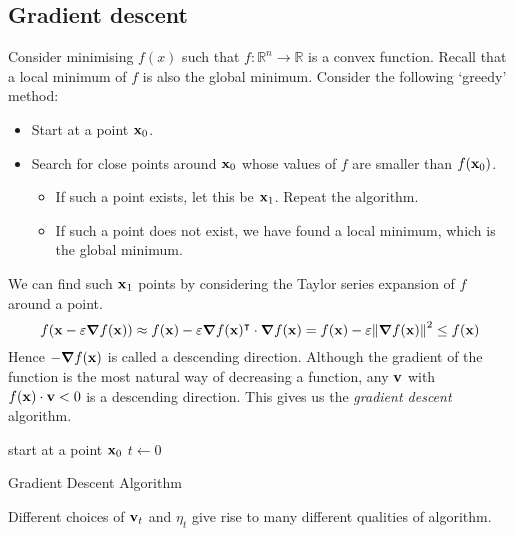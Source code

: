 \subsection{Gradient descent}
Consider minimising \(f(x)\) such that \(f \colon \mathbb R^n \to \mathbb R\) is a convex function.
Recall that a local minimum of \(f\) is also the global minimum.
Consider the following `greedy' method:
\begin{itemize}
	\item Start at a point \(\vb x_0\).
	\item Search for close points around \(\vb x_0\) whose values of \(f\) are smaller than \(f(\vb x_0)\).
	      \begin{itemize}
		      \item If such a point exists, let this be \(\vb x_1\).
		            Repeat the algorithm.
		      \item If such a point does not exist, we have found a local minimum, which is the global minimum.
	      \end{itemize}
\end{itemize}
We can find such \(\vb x_1\) points by considering the Taylor series expansion of \(f\) around a point.
\[
	f(\vb x - \varepsilon\grad{f(\vb x)}) \approx f(\vb x) - \varepsilon \grad{f(\vb x)}^\intercal \cdot \grad{f(\vb x)} = f(\vb x) - \varepsilon\norm{\grad{f(\vb x)}}^2 \leq f(\vb x)
\]
Hence \(-\grad{f(\vb x)}\) is called a descending direction.
Although the gradient of the function is the most natural way of decreasing a function, any \(\vb v\) with \(f(\vb x) \cdot \vb v < 0\) is a descending direction.
This gives us the \textit{gradient descent} algorithm.

\begin{algorithm*}[H]
	\SetAlgoLined{}
	start at a point \(\vb x_0\)\;
	\(t \leftarrow 0\)\;
	\caption{Gradient Descent Algorithm}
\end{algorithm*}

\noindent Different choices of \(\vb v_t\) and \(\eta_t\) give rise to many different qualities of algorithm.

